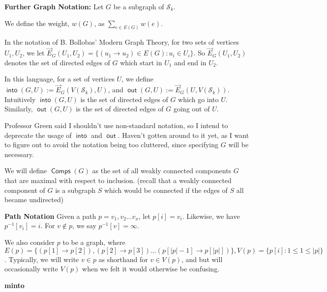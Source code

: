 \documentclass{article}
\DeclareMathOperator{\out}{\bm{\mathsf{out}}}
\DeclareMathOperator{\into}{\bm{\mathsf{into}}}
\DeclareMathOperator{\Comp}{\bm{\mathsf{Comps}}}
\begin{document}
\vspace{1.75em}

\textbf{Further Graph Notation:} Let $G$ be a subgraph of $\mathcal{S}_k$.

\vspace{1.75em}

We define the weight, $w(G)$, as $\sum_{e \in E(G)} w(e)$.

\vspace{1.75em}

In the notation of B. Bollobas' Modern Graph Theory, for two sets of vertices $U_1,U_2$, we let $\vec{E}_G(U_1,U_2) = \{(u_1\to u_2)\in E(G):u_i\in U_i\}$. So $\vec{E}_G(U_1,U_2)$ denotes the set of directed edges of $G$ which start in $U_1$ and end in $U_2$. 

In this language, for a set of vertices $U$, we define $\into(G,U) := \vec{E}_G(V(\mathcal{S}_k),U)$, and $\out(G,U):=\vec{E}_G(U,V(\mathcal{S}_k))$. Intuitively $\into(G,U)$ is the set of directed edges of $G$ which go into $U$. Similarly, $\out(G,U)$ is the set of directed edges of $G$ going out of $U$. 

Professor Green said I shouldn't use non-standard notation, so I intend to deprecate the usage of $\into$ and $\out$. Haven't gotten around to it yet, as I want to figure out to avoid the notation being too cluttered, since specifying $G$ will be necessary.

\vspace{1.75em}

We will define $\Comp(G)$ as the set of all weakly connected components $G$ that are maximal with respect to inclusion. (recall that a weakly connected component of $G$ is a subgraph $S$ which would be connected if the edges of $S$ all became undirected)

\vspace{1.75em}

\textbf{Path Notation} Given a path $p = v_1,v_2 \dots v_x$, let $p[i] = v_i$. Likewise, we have $p^{-1}[v_i] =i$. For $v \not \in p$, we say $p^{-1}[v] = \infty$. 

We also consider $p$ to be a graph, where $E(p) = \{(p[1] \to p[2]),(p[2] \to p[3])\dots (p[|p|-1] \to p[|p|])\}, V(p) = \{p[i]:1\le 1 \le |p|\}$. Typically, we will write $v \in p$ as shorthand for $v \in V(p)$, and but will occasionally write $V(p)$ when we felt it would otherwise be confusing.

\vspace{1.75em}

\textbf{minto} 
\end{document}
